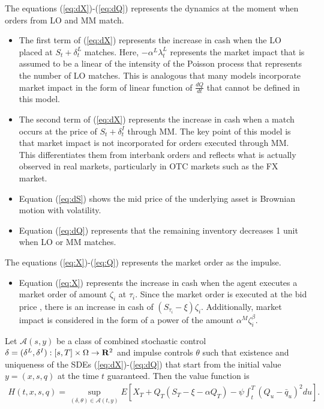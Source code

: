 \documentclass[12pt]{article}
\begin{document}
The equations (\ref{eq:dX})-(\ref{eq:dQ}) represents the dynamics at the moment when orders from LO and MM match.
\begin{itemize}
  \item The first term of (\ref{eq:dX}) represents the increase in cash when the LO placed at $S_t + \delta^L_t$ matches. 
  Here, $-\alpha^L\lambda^L_t$ represents the market impact that is assumed to be a linear of the intensity of the Poisson process that represents the number of LO matches. 
  This is analogous that many models incorporate market impact in the form of linear function of $\frac{dQ}{dt}$
  that cannot be defined in this model.
  \item The second term of (\ref{eq:dX}) represents the increase in cash when a match occurs at the price of $S_t + \delta^I_t$ through MM.
  The key point of this model is that market impact is not incorporated for orders executed through MM. 
  This differentiates them from interbank orders and reflects what is actually observed in real markets, particularly in OTC markets such as the FX market.
  \item Equation (\ref{eq:dS}) shows the mid price of the underlying asset is Brownian motion with volatility.
  \item Equation (\ref{eq:dQ}) represents that the remaining inventory decreases 1 unit when LO or MM matches.
\end{itemize}
The equations (\ref{eq:X})-(\ref{eq:Q}) represents the market order as the impulse.
\begin{itemize}
  \item Equation (\ref{eq:X}) represents the increase in cash when the agent executes a market order of amount $\zeta_i$ at $\tau_i$.
  Since the market order is executed at the bid price , there is an increase in cash of $(S_{\tau_i}-\xi)\zeta_i$.
  Additionally, market impact is considered in the form of a power of the amount $\alpha^M \zeta_i^{\beta}$.
\end{itemize}
Let $\mathcal{A}(s, y)$ be a class of combined stochastic control $\delta=(\delta^L, \delta^I): [s, T]\times \Omega \rightarrow {\bf R}^2$ and impulse controls $\theta$ such that 
existence and uniqueness of the SDEs (\ref{eq:dX})-(\ref{eq:dQ}) that start from the initial value $y=(x, s, q)$ at the time $t$ guaranteed.
Then the value function is 
\begin{align}
  H(t,x,s, q) = \sup_{(\delta, \theta) \in \mathcal{A}(t, y)} E\left[ X_T + Q_T(S_T-\xi -\alpha Q_T) - \psi \int_t^T (Q_u-\bar{q}_u)^2 du \right]. \label{eq:val}
\end{align}
\end{document}
